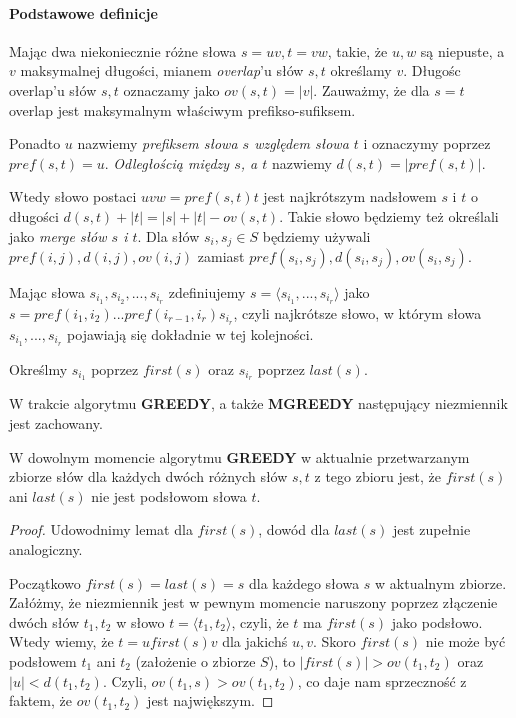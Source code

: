 \paragraph{Podstawowe definicje}

Mając dwa niekoniecznie różne słowa $s = uv, t = vw$, takie, że $u,w$ są niepuste, a $v$ maksymalnej długości, mianem \textit{overlap}'u słów $s,t$ określamy $v$.
Długośc overlap'u słów $s,t$ oznaczamy jako $ov(s,t) = |v|$. Zauważmy, że dla $s=t$ overlap jest maksymalnym właściwym prefikso-sufiksem. 

Ponadto $u$ nazwiemy \textit{prefiksem słowa $s$ względem słowa $t$} i oznaczymy poprzez \linebreak $pref(s,t) = u$. \textit{Odległością między $s$, a $t$} nazwiemy $d(s,t)=|pref(s,t)|$.

Wtedy słowo postaci $uvw = pref(s,t)t$ jest najkrótszym nadsłowem $s$ i $t$ o długości $d(s,t) + |t| = |s| + |t| - ov(s,t)$. Takie słowo będziemy też określali jako
\textit{merge słów $s$ i $t$}. 
Dla słów $s_i, s_j \in S$ będziemy używali 
$pref(i,j), d(i, j), ov(i, j)$ zamiast \linebreak
$pref(s_i,s_j), d(s_i,s_j), ov(s_i, s_j)$.

Mając słowa $s_{i_1}, s_{i_2},...,s_{i_r}$ zdefiniujemy $s = \langle s_{i_1},...,s_{i_r}\rangle$ jako \\ $s = pref(i_1,i_2)...pref(i_{r-1}, i_r)s_{i_r}$, czyli najkrótsze słowo, w którym słowa
$s_{i_1},...,s_{i_r}$ pojawiają się dokładnie w tej kolejności.

Określmy $s_{i_1}$ poprzez $first(s)$ oraz $s_{i_r}$ poprzez $last(s)$.

W trakcie algorytmu \textbf{GREEDY}, a także \textbf{MGREEDY} następujący niezmiennik jest zachowany.

\begin{lemma}{}{}
  
W dowolnym momencie algorytmu \textbf{GREEDY} w aktualnie przetwarzanym zbiorze słów dla każdych dwóch różnych słów $s,t$ z tego zbioru jest, że 
$first(s)$ ani $last(s)$ nie jest podsłowom słowa $t$.

\end{lemma}

\begin{proof}
Udowodnimy lemat dla $first(s)$, dowód dla $last(s)$ jest zupełnie analogiczny.

Początkowo $first(s)=last(s)=s$ dla każdego słowa $s$ w aktualnym zbiorze. Załóżmy, że niezmiennik jest w pewnym momencie naruszony poprzez złączenie dwóch słów 
$t_1,t_2$ w słowo $t = \langle t_1,t_2\rangle$, czyli, że $t$ ma $first(s)$ jako podsłowo. Wtedy wiemy, że 
$t = ufirst(s)v$ dla jakichś $u,v$. Skoro $first(s)$ nie może być podsłowem 
$t_1$ ani $t_2$ (założenie o zbiorze $S$), to $|first(s)| > ov(t_1,t_2)$ oraz 
$|u| < d(t_1,t_2)$. Czyli, $ov(t_1, s) > ov(t_1, t_2)$, co daje nam sprzeczność z faktem, że $ov(t_1,t_2)$ jest największym.
\end{proof}

